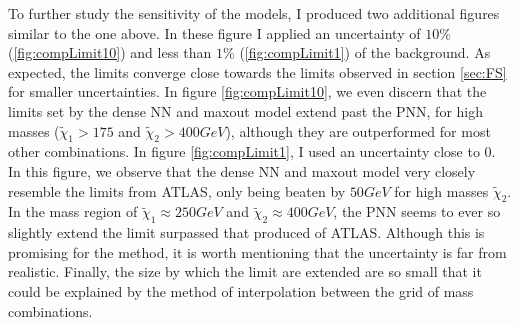 To further study the sensitivity of the models, I produced two additional figures similar to the one above. In these figure I applied an uncertainty of 
$10\%$ (\ref{fig:compLimit10}) and less than $1\%$ (\ref{fig:compLimit1}) of the background. As expected, the limits converge close towards the limits 
observed in section \ref{sec:FS} for smaller uncertainties. In figure \ref{fig:compLimit10}, we even discern that the limits set by the dense \ac{NN}
and maxout model extend past the \ac{PNN}, for high masses ($\tilde{\chi}_1>175$ and $\tilde{\chi}_2>400GeV$), although they are outperformed for most other combinations.
In figure \ref{fig:compLimit1}, I used an uncertainty close to 0. In this figure, we observe that the dense \ac{NN} and maxout model 
very closely resemble the limits from ATLAS, only being beaten by $50GeV$ for high masses $\tilde{\chi}_2$. In the mass region of
$\tilde{\chi}_1\approx250GeV$ and $\tilde{\chi}_2\approx400GeV$, the \ac{PNN} seems to ever so slightly extend the limit surpassed that produced of ATLAS.
Although this is promising for the method, it is worth mentioning that the uncertainty is far from realistic. Finally, the size by which the limit are extended
are so small that it could be explained by the method of interpolation between the grid of mass combinations.
